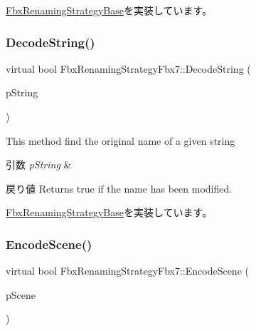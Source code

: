 \hyperlink{class_fbx_renaming_strategy_base_a6c368dff1424b4b54cdfa49ad49bf09c}{Fbx\+Renaming\+Strategy\+Base}を実装しています。

\mbox{\label{class_fbx_renaming_strategy_fbx7_a9f8f8714746bdc9904c31741e0b595f6}} 
\subsubsection{\texorpdfstring{Decode\+String()}{DecodeString()}}
{\footnotesize\ttfamily virtual bool Fbx\+Renaming\+Strategy\+Fbx7\+::\+Decode\+String (\begin{DoxyParamCaption}\item[{\hyperlink{class_fbx_name_handler}{Fbx\+Name\+Handler} \&}]{p\+String }\end{DoxyParamCaption})\hspace{0.3cm}{\ttfamily [virtual]}}

This method find the original name of a given string 
\begin{DoxyParams}{引数}
{\em p\+String} & \\
\hline
\end{DoxyParams}
\begin{DoxyReturn}{戻り値}
Returns true if the name has been modified. 
\end{DoxyReturn}


\hyperlink{class_fbx_renaming_strategy_base_acc30037744da35fa2b59fdd4ff6d9ede}{Fbx\+Renaming\+Strategy\+Base}を実装しています。

\mbox{\label{class_fbx_renaming_strategy_fbx7_a9c3d4574319c2e744a80d66f6c7c0ae3}} 
\subsubsection{\texorpdfstring{Encode\+Scene()}{EncodeScene()}}
{\footnotesize\ttfamily virtual bool Fbx\+Renaming\+Strategy\+Fbx7\+::\+Encode\+Scene (\begin{DoxyParamCaption}\item[{\hyperlink{class_fbx_scene}{Fbx\+Scene} $\ast$}]{p\+Scene }\end{DoxyParamCaption})\hspace{0.3cm}{\ttfamily [virtual]}}

